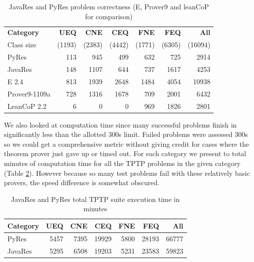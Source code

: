 \documentclass{llncs}
\begin{document}
\begin{table}[tbh]
  \begin{tabular}{lrrrrrr}
    \hline
    \textbf{Category} & \textbf{UEQ} & \textbf{CNE} & \textbf{CEQ} & \textbf{FNE} & \textbf{FEQ} & \textbf{All}\\
    {\tiny Class size} & {\tiny (1193)} & {\tiny (2383)} & {\tiny (4442)} & {\tiny (1771)} & {\tiny (6305)} & {\tiny (16094)}\\
    \hline             %
    PyRes              &   113 &   945 &   499 &   632 &   725 &  2914 \\
    JavaRes            &   148 &  1107 &   644 &   737 &  1617 &  4253 \\
    \hline
    E 2.4              &   813 &  1939 &  2648 &  1484 &  4054 & 10938 \\
    Prover9-1109a      &   728 &  1316 &  1678 &   709 &  2001 &  6432 \\
    LeanCoP 2.2        &     6 &     0 &     0 &   969 &  1826 &  2801 \\
    \hline
  \end{tabular}
  \caption{JavaRes and PyRes problem correctness (E, Prover9 and leanCoP for comparison)}
  \label{tab:res}
\end{table}

We also looked at computation time since many successful problems finish in significantly less than the allotted
300s limit.  Failed problems were assessed 300s so we could get a comprehensive metric without giving credit
for cases where the theorem prover just gave up or timed out.  For each category we present to total minutes of computation time for all
the TPTP problems in the given category (Table \ref{tab:res2}). However because so many test problems fail with these
relatively basic provers, the speed difference is somewhat obscured.

\begin{table}[tbh]
  \begin{tabular}{lrrrrrr}
    \hline
    \textbf{Category} & \textbf{UEQ} & \textbf{CNE} & \textbf{CEQ} & \textbf{FNE} & \textbf{FEQ} & \textbf{All}\\
    \hline              %
    PyRes              &   5457 &  7395 &   19929 &   5800 &   28193 &  66777 \\
    JavaRes            &   5295 &  6508 &   19203 &   5231 &   23583 &  59823 \\
    \hline
  \end{tabular}
  \caption{JavaRes and PyRes total TPTP suite execution time in minutes}
  \label{tab:res2}
\end{table}
\end{document}
